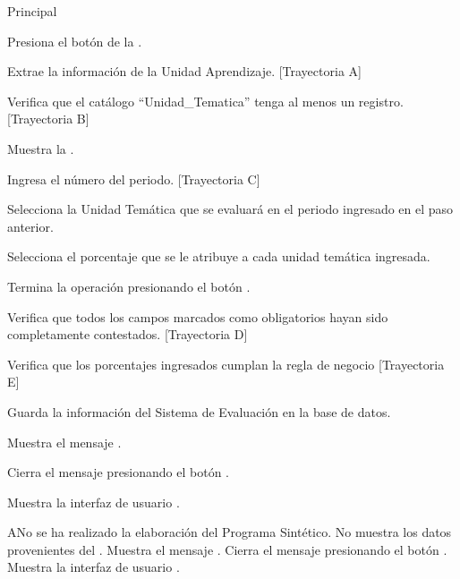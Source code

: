 \begin{UCtrayectoria}{Principal}

    \UCpaso[\UCactor] Presiona el botón  de la .
    
    \UCpaso Extrae la información de la Unidad Aprendizaje. [Trayectoria A]
	
	\UCpaso Verifica que el catálogo ``Unidad\_Tematica'' tenga al menos un registro. [Trayectoria B]
	
	\UCpaso Muestra la .
	
	\UCpaso[\UCactor] Ingresa el número del periodo. [Trayectoria C]
	
	\UCpaso[\UCactor] Selecciona la Unidad Temática que se evaluará en el periodo ingresado en el paso anterior.
	
	\UCpaso[\UCactor] Selecciona el porcentaje que se le atribuye a cada unidad temática ingresada.
	
	\UCpaso[\UCactor] Termina la operación presionando el botón .
        
    \UCpaso Verifica que todos los campos marcados como obligatorios hayan sido completamente contestados. [Trayectoria D]
    
    \UCpaso Verifica que los porcentajes ingresados cumplan la regla de negocio  [Trayectoria E]
    
    \UCpaso Guarda la información del Sistema de Evaluación en la base de datos.
    
    \UCpaso Muestra el mensaje .
    
    \UCpaso[\UCactor] Cierra el mensaje presionando el botón .
    
    \UCpaso Muestra la interfaz de usuario .
\end{UCtrayectoria}


\begin{UCtrayectoriaA}{A}{No se ha realizado la elaboración del Programa Sintético.}
	\UCpaso No muestra los datos provenientes del .
	\UCpaso Muestra el mensaje .
	\UCpaso[\UCactor] Cierra el mensaje presionando el botón .
	\UCpaso Muestra la interfaz de usuario .
\end{UCtrayectoriaA}

